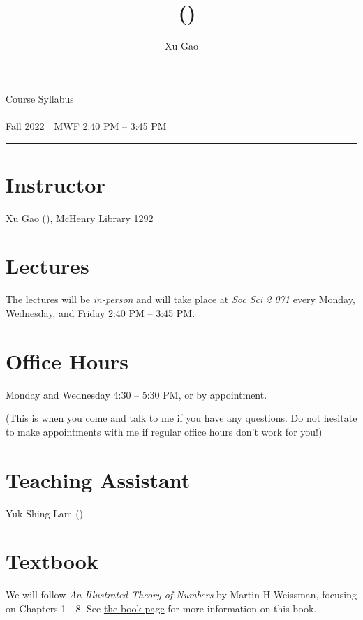 \documentclass[12pt]{article}
\title{\coursenumber~(\coursetitle)}
\author{Xu Gao}
\makeatletter
\def\suptitle{}
\def\subtitle{}
\def\coursequarter{}
\def\coursedate{}
\renewcommand\maketitle{
{\raggedright %
\begin{center}
	\ttfamily
	{\large\color{SkyBlue}\suptitle}\\[2ex]
	{\LARGE\@title}\\[2ex]
	{\large\subtitle}\\[2ex]\hrule
\end{center}}} %
\renewcommand\suptitle{Course Syllabus}
\renewcommand\subtitle{\coursequarter~\textbullet~\coursedate}
\renewcommand\coursequarter{Fall 2022}
\renewcommand\coursedate{MWF 2:40 PM -- 3:45 PM}
\makeatother
\begin{document}
\thispagestyle{firstpage}
\maketitle

\section{Instructor} 
Xu Gao (), McHenry Library 1292

\section{Lectures}  
The lectures will be \emph{in-person} and will take place at \emph{Soc Sci 2 071} every Monday, Wednesday, and Friday 2:40 PM -- 3:45 PM. 

\section{Office Hours}
Monday and Wednesday 4:30 -- 5:30 PM, or by appointment. 

\noindent
{\footnotesize (This is when you come and talk to me if you have any questions. Do not hesitate to make appointments with me if regular office hours don't work for you!)}

\section{Teaching Assistant} 
Yuk Shing Lam ()

\section{Textbook} We will follow \textit{\color{MidnightBlue} An Illustrated Theory of Numbers} by Martin H Weissman, focusing on Chapters 1 - 8. See \href{http://illustratedtheoryofnumbers.com/}{the book page} for more information on this book. 
\end{document}
